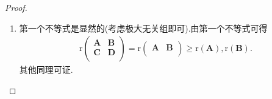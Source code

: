 \documentclass[../../main.tex]{subfiles}%
\begin{document}
\begin{proof}
\begin{enumerate}[(1)]
\item 第一个不等式是显然的(考虑极大无关组即可).由第一个不等式可得
\begin{align*}
\mathrm{r}\left( \begin{matrix}
\boldsymbol{A}&		\boldsymbol{B}\\
\boldsymbol{C}&		\boldsymbol{D}\\
\end{matrix} \right) =\mathrm{r}\left( \begin{matrix}
\boldsymbol{A}&		\boldsymbol{B}\\
\end{matrix} \right) \geqslant \mathrm{r}\left( \boldsymbol{A} \right) ,\mathrm{r}\left( \boldsymbol{B} \right) .
\end{align*}
其他同理可证.
\end{enumerate}

\end{proof}
\end{document}
